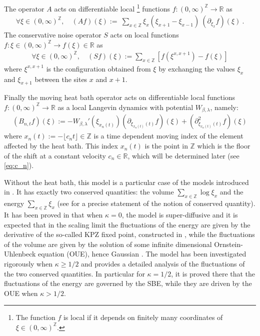 \documentclass[a4paper, reqno, 12pt]{amsart}
\theoremstyle{plain}
\theoremstyle{definition}
\newcommand{\R}{\mathbb{R}}
\newcommand{\Z}{\mathbb{Z}}
\begin{document}
\bigskip

The operator $A$ acts on differentiable local {\footnote{The function $f$ is local if it depends on finitely many coordinates of $\xi\in(0,\infty)^{\mathbb Z}$.}} functions $f:(0,\infty)^{\Z}\to \R$ as
\begin{align*}
    \forall \xi\in (0,\infty)^{\mathbb Z}, \quad (Af)(\xi) :=\ \sum_{x\in\mathbb{Z}} \xi_x( \xi_{x+1}- \xi_{x-1})  \  (  \partial_{\xi_x} f )(\xi) \ .
\end{align*}
The conservative noise operator $S$ acts on local functions $f:\xi \in (0,\infty)^{\Z}\to f(\xi) \in \R$ as
\begin{align*}
    \forall \xi\in (0,\infty)^{\mathbb Z}, \quad (Sf)(\xi) := \sum_{x\in{\mathbb Z}} \left[ f(\xi^{x,x+1}) -f(\xi)\right]
\end{align*}
where $\xi^{x,x+1}$ is the configuration obtained from $\xi$ by exchanging the values $\xi_x$ and $\xi_{x+1}$ between the sites $x$ and $x+1$.

Finally the moving heat bath operator acts on differentiable local functions $f:(0,\infty)^{\Z}\to \R$ as a local Langevin dynamics with potential $W_{\beta,\lambda}$, namely: 
\begin{align*}
    (B_{n,t}f)(\xi) := -W_{\beta,\lambda}'(\xi_{x_n(t)}) (\partial_{\xi_{x_n(t)}(t)}f)(\xi) + (\partial_{\xi_{x_n(t)}(t)}^2f)(\xi)
\end{align*}
where $x_n(t):= -\lfloor c_nt\rfloor \in \mathbb Z$ is a time dependent moving index of the element affected by the heat bath. This index $x_n(t)$ is the point in $\Z$ which is the floor of the shift at a constant velocity $c_n\in\R$, which will be determined later (see \eqref{eq:c_n}).

\bigskip
Without the heat bath, this model is a particular case of the models introduced in \cite{BS12}. It has exactly two conserved quantities: the volume $\sum_{x\in\mathbb Z} \log \xi_x$ and the energy $\sum_{x\in\mathbb Z} \xi_{x}$ (see \cite{BS12} for a precise statement of the notion of conserved quantity). It has been proved in \cite{BG14} that when $\kappa=0$, the model is super-diffusive and it is expected that in the scaling limit the fluctuations of the energy are given by the derivative of the so-called KPZ fixed point, constructed in \cite{MQR21}, while the fluctuations of the volume are given by the solution of some infinite dimensional Ornstein-Uhlenbeck equation (OUE), hence Gaussian \cite{SS15}. The model has been investigated rigorously when $\kappa\ge 1/2$ and \cite{ABGS22} provides a detailed analysis of the fluctuations of the two conserved quantities. In particular for $\kappa=1/2$, it is proved there that the fluctuations of the energy are governed by the SBE, while they are driven by the OUE when $\kappa>1/2$.    
\end{document}
